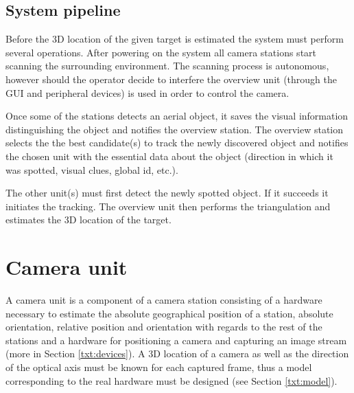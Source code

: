 \begin{figure}[htb]
\begin{minipage}{.48\textwidth}
		\label{fig:spilberk_camera_units}
	\end{minipage}
\end{figure}

\section{System pipeline}

Before the 3D location of the given target is estimated the system must perform several operations. After powering on the system all camera stations start scanning the surrounding environment. The scanning process is autonomous, however should the operator decide to interfere the overview unit (through the GUI and peripheral devices) is used in order to control the camera. 

Once some of the stations detects an aerial object, it saves the visual information distinguishing the object and notifies the overview station. The overview station selects the the best candidate(s) to track the newly discovered object and notifies the chosen unit with the essential data about the object (direction in which it was spotted, visual clues, global id, etc.).

The other unit(s) must first detect the newly spotted object. If it succeeds it initiates the tracking. The overview unit then performs the triangulation and estimates the 3D location of the target.


\chapter{Camera unit} \label{txt:camera_unit}

A camera unit is a component of a camera station consisting of a hardware necessary to estimate the absolute geographical position of a station, absolute orientation, relative position and orientation with regards to the rest of the stations and a hardware for positioning a camera and capturing an image stream (more in Section \ref{txt:devices}). A 3D location of a camera as well as the direction of the optical axis must be known for each captured frame, thus a model corresponding to the real hardware must be designed (see Section \ref{txt:model}).

